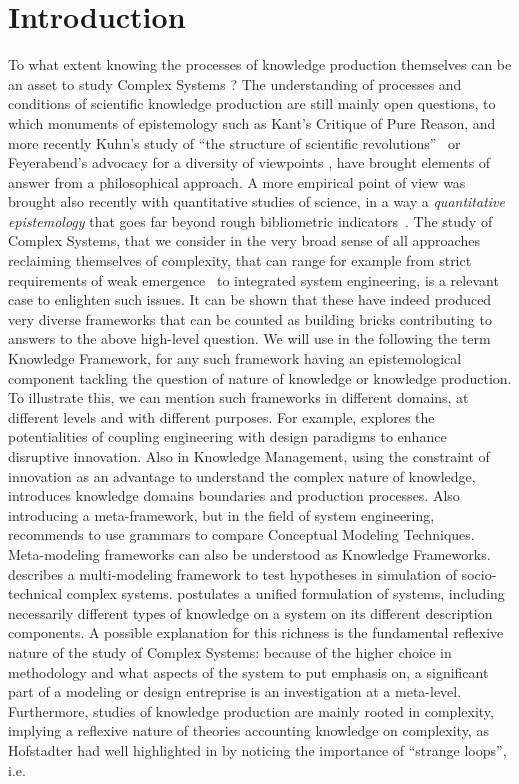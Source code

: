 \documentclass[runningheads,a4paper]{llncs2e/llncs}
\begin{document}
\section{Introduction}


To what extent knowing the processes of knowledge production themselves can be an asset to study Complex Systems ? The understanding of processes and conditions of scientific knowledge production are still mainly open questions, to which monuments of epistemology such as Kant's Critique of Pure Reason, and more recently Kuhn's study of ``the structure of scientific revolutions''~\cite{kuhn1970structure} or Feyerabend's advocacy for a diversity of viewpoints \cite{feyerabend1993against}, have brought elements of answer from a philosophical approach. A more empirical point of view was brought also recently with quantitative studies of science, in a way a \emph{quantitative epistemology} that goes far beyond rough bibliometric indicators~\cite{cronin2014beyond}. The study of Complex Systems, that we consider in the very broad sense of all approaches reclaiming themselves of complexity, that can range for example from strict requirements of weak emergence~\cite{bedau2002downward} to integrated system engineering, is a relevant case to enlighten such issues. It can be shown that these have indeed produced very diverse frameworks that can be counted as building bricks contributing to answers to the above high-level question. We will use in the following the term Knowledge Framework, for any such framework having an epistemological component tackling the question of nature of knowledge or knowledge production. To illustrate this, we can mention such frameworks in different domains, at different levels and with different purposes. For example, \cite{durantin2017disruptive} explores the potentialities of coupling engineering with design paradigms to enhance disruptive innovation. Also in Knowledge Management, using the constraint of innovation as an advantage to understand the complex nature of knowledge, \cite{carlile2004transferring} introduces knowledge domains boundaries and production processes. Also introducing a meta-framework, but in the field of system engineering, \cite{gemino2004framework} recommends to use grammars to compare Conceptual Modeling Techniques. Meta-modeling frameworks can also be understood as Knowledge Frameworks. \cite{cottineau2015modular} describes a multi-modeling framework to test hypotheses in simulation of socio-technical complex systems. \cite{golden2012modeling} postulates a unified formulation of systems, including necessarily different types of knowledge on a system on its different description components. A possible explanation for this richness is the fundamental reflexive nature of the study of Complex Systems: because of the higher choice in methodology and what aspects of the system to put emphasis on, a significant part of a modeling or design entreprise is an investigation at a meta-level.  Furthermore, studies of knowledge production are mainly rooted in complexity, implying a reflexive nature of theories accounting knowledge on complexity, as Hofstadter had well highlighted in \cite{hofstadter1980godel} by noticing the importance of ``strange loops'', i.e. 
\end{document}
